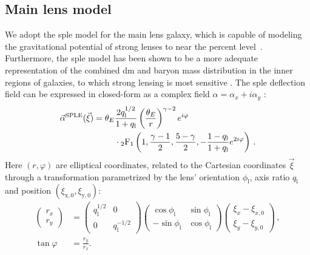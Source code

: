 \subsection{Main lens model}\label{subsec:sl-model-lens}

    
We adopt the \gls*{sple} model for the main lens galaxy, which is capable of modeling the gravitational potential of strong lenses to near the percent level~\cite{Suyu:2008zp}. Furthermore, the \gls*{sple} model has been shown to be a more adequate representation of the combined \gls*{dm} and baryon mass distribution in the inner regions of galaxies, to which strong lensing is most sensitive \cite{Suyu:2008zp}. The \gls*{sple} deflection field can be expressed in closed-form as a complex field $\alpha = \alpha_x + i \alpha_y$ \cite{Tessore:2015baa,ORiordan:2020aa}:
\begin{equation}
\begin{split}
    \vec{\alpha}^\mathrm{SPLE}(\vec{\xi}) = \theta_E & \frac{2 q_\mathrm{l}^{1/2}}{1 + q_\mathrm{l}} \left( \frac{\theta_E}{r} \right)^{\gamma - 2} e^{i \varphi} \\
    & \cdot {}_2\mathrm{F}_1\left( 1, \frac{\gamma - 1}{2}, \frac{5 - \gamma}{2}, -\frac{1-q_\mathrm{l}}{1+q_\mathrm{l}} e^{2 i \varphi} \right) \, .
\end{split}
\end{equation}
Here $(r, \varphi)$ are elliptical coordinates, related to the Cartesian coordinates $\vec{\xi}$ through a transformation parametrized by the lens' orientation $\phi_\mathrm{l}$, axis ratio $q_\mathrm{l}$ and position $(\xi_\mathrm{x, 0}, \xi_\mathrm{y, 0})$:
\begin{align}
    \begin{pmatrix} r_x \\ r_y \end{pmatrix} &= \begin{pmatrix} q_\mathrm{l}^{1/2} & 0 \\ 0 & q_\mathrm{l}^{-1/2} \end{pmatrix} \begin{pmatrix} \cos\phi_\mathrm{l} & \sin\phi_\mathrm{l} \\ -\sin\phi_\mathrm{l} & \cos\phi_\mathrm{l} \end{pmatrix} \begin{pmatrix} \xi_x - \xi_{x, 0} \\ \xi_y - \xi_{y, 0} \end{pmatrix} \, ,\\
    \tan \varphi &= \frac{r_y}{r_x}.
\end{align}

